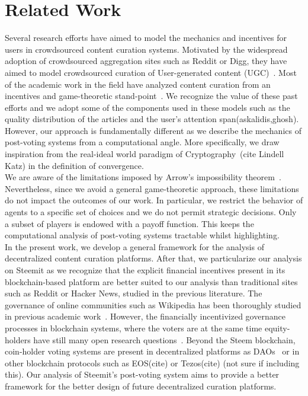 \section{Related Work}
  Several research efforts have aimed to model the mechanics and incentives for users in crowdsourced content curation systems. Motivated by the widespread adoption of crowdsourced aggregation sites such as Reddit or Digg, they have aimed to model crowdsourced curation of User-generated content (UGC)~\cite{askalidis2013theoretical}. Most of the academic work in the field have analyzed content curation from an incentives and game-theoretic stand-point~\cite{ghosh2011incentivizing,das2010ranking,gupte2009news}. We recognize the value of these past efforts and we adopt some of the components used in these models such as the quality distribution of the articles and the user's attention span(askalidis,ghosh). However, our approach is fundamentally different as we describe the mechanics of post-voting systems from a computational angle. More specifically, we draw inspiration from the real-ideal world paradigm of Cryptography~\cite{rationalprotocol}(cite Lindell Katz) in the definition of convergence.\\
  
  We are aware of the limitations imposed by Arrow's impossibility theorem~\cite{arrow1950difficulty}. Nevertheless, since we avoid a general game-theoretic approach, these limitations do not impact the outcomes of our work. In particular, we restrict the behavior of agents to a specific set of choices and we do not permit strategic decisions. Only a subset of players is endowed with a payoff function. This keeps the computational analysis of post-voting systems tractable whilst highlighting.\\

  
  In the present work, we develop a general framework for the analysis of decentralized content curation platforms. After that, we particularize our analysis on Steemit as we recognize that the explicit financial incentives present in its blockchain-based platform are better suited to our analysis than traditional sites such as Reddit or Hacker News, studied in the previous literature. The governance of online communities such as Wikipedia has been thoroughly studied in previous academic work~\cite{leskovec2010governance,forte2008scaling}. However, the financially incentivized governance processes in blockchain systems, where the voters are at the same time equity-holders have still many open research questions~\cite{vitalik, ehrsam}. Beyond the Steem blockchain, coin-holder voting systems are present in decentralized platforms as DAOs~\cite{darkdaos} or in other blockchain protocols such as EOS(cite) or Tezos(cite) (not sure if including this). Our analysis of Steemit's post-voting system aims to provide a better framework for the better design of future decentralized curation platforms.
  
  
